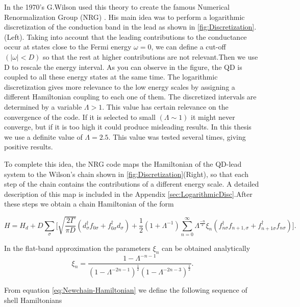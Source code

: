 In the 1970's G.Wilson used this theory to create the famous Numerical Renormalization Group (NRG) \citep{bulla_numerical_2008,wilson_renormalization_1975,krishna-murthy_renormalization-group_1980}. His main idea was to perform a logarithmic discretization of the conduction band in the lead as shown in \ref{fig:Discretization}.(Left).  Taking into account that the leading contributions to the conductance occur at states close to the Fermi energy $\omega = 0$, we can define a cut-off $( \vert \omega \vert < D)$ so that the rest at higher contributions are not relevant.Then we use D to rescale the energy interval. As you can observe in the figure, the QD is coupled to all these energy states at the same time. The logarithmic discretization gives more relevance to the low energy scales by assigning a different Hamiltonian coupling to each one of them.  The discretized intervals are determined by a variable $\Lambda>1$. This value has certain relevance on the convergence of the code. If it is selected to small $(\Lambda \sim 1)$ it might never converge, but if it is too high it could produce misleading results. In this thesis we use a definite value of $\Lambda = 2.5$. This value was tested several times, giving positive results. 

To complete this idea, the NRG code maps the Hamiltonian of the QD-lead system to the Wilson's chain shown in \ref{fig:Discretization}(Right), so that each step of the chain contains the contributions of a different energy scale. A detailed description of this map is included in the Appendix \ref{sec:LogarithmicDisc}.After these steps we obtain a chain Hamiltonian of the form 

\begin{equation}
H=H_{d}+D\sum_{\sigma}\Biggl[\sqrt{\frac{2\Gamma}{\pi D}}\left(d_{\sigma}^{\dagger}f_{0\sigma}+f_{0\sigma}^{\dagger}d_{\sigma}\right)+\frac{1}{2}\left(1+\Lambda^{-1}\right)\sum_{n=0}^{\infty}\Lambda^{\frac{-n}{2}}\xi_{n}\left(f_{n\sigma}^{\dagger}f_{n+1,\sigma}+f_{n+1\sigma}^{\dagger}f_{n\sigma}\right)\Biggr].\label{eq:Newchain-Hamiltonian}
\end{equation}


\noindent In the flat-band approximation the parameters $\xi_{n}$ can be obtained analytically \citep{bulla_numerical_2008}
\[
\xi_{n}=\frac{1-\Lambda^{-n-1}}{\left(1-\Lambda^{-2n-1}\right)^{\frac{1}{2}}\left(1-\Lambda^{-2n-3}\right)^{\frac{1}{2}}}.
\]


From equation \eqref{eq:Newchain-Hamiltonian}  we define the following sequence of shell Hamiltonians

